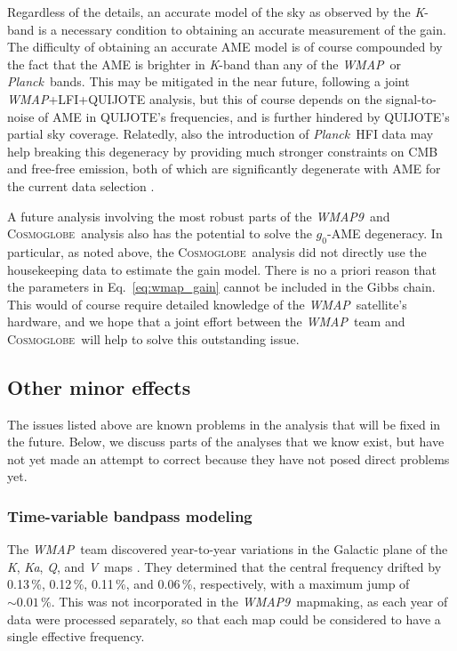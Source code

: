 \documentclass[twocolumn]{../../common/aa}
\def\WMAP{\emph{WMAP}}
\def\WMAPnine{\emph{WMAP9}}
\def\Planck{\emph{Planck}}
\newcommand{\cosmoglobe}{\textsc{Cosmoglobe}}
\newcommand{\K}[0]{\textit K}
\newcommand{\Ka}[0]{\textit{Ka}}
\newcommand{\Q}[0]{\textit Q}
\newcommand{\V}[0]{\textit V}
\begin{document}
Regardless of the details, an accurate model of the sky as observed by the \K-band is a necessary condition to obtaining an accurate measurement of the gain. The difficulty of obtaining an accurate AME model is of course compounded by the fact that the AME is brighter in \K-band than any of the \WMAP\ or \Planck\ bands. This may be mitigated in the near future, following a joint \WMAP+LFI+QUIJOTE analysis, but this of course depends on the signal-to-noise of AME in QUIJOTE's frequencies, and is further hindered by QUIJOTE's partial sky coverage. Relatedly, also the introduction of \Planck\ HFI data may help breaking this degeneracy by providing much stronger constraints on CMB and free-free emission, both of which are significantly degenerate with AME for the current data selection \citep{bp13}.

A future analysis involving the most robust parts of the \WMAPnine\ and \cosmoglobe\ analysis also has the potential to solve the $g_0$-AME degeneracy. In particular, as noted above, the \cosmoglobe\ analysis did not directly use the housekeeping data to estimate the gain model. There is no a priori reason that the parameters in Eq.~\eqref{eq:wmap_gain} cannot be included in the Gibbs chain. This would of course require detailed knowledge of the \WMAP\ satellite's hardware, and we hope that a joint effort between the \WMAP\ team and \cosmoglobe\ will help to solve this outstanding issue.

\subsection{Other minor effects}
\label{sec:minor}

The issues listed above are known problems in the analysis that will be fixed in the future. Below, we discuss parts of the analyses that we know exist, but have not yet made an attempt to correct because they have not posed direct problems yet.

\subsubsection{Time-variable bandpass modeling}

The \WMAP\ team discovered year-to-year variations in the Galactic plane of the \K, \Ka, \Q, and \V\ maps \citep[Appendix A]{bennett2012}. They determined that the central frequency drifted by 0.13\,\%, 0.12\,\%, 0.11\,\%, and 0.06\,\%, respectively, with a maximum jump of $\sim0.01\,\%$. This was not incorporated in the \WMAPnine\ mapmaking, as each year of data were processed separately, so that each map could be considered to have a single effective frequency.
\end{document}

